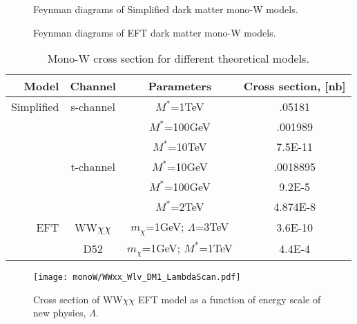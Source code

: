 \begin{figure}[hb]
  \quad
  \caption{Feynman diagrams of Simplified dark matter mono-W models.}
  \label{fig:feynMonoWSimple}
\end{figure}

\begin{figure}[hb]
  \quad
  \caption{Feynman diagrams of EFT dark matter mono-W models.}
  \label{fig:feynMonoWEFT}
\end{figure}


\begin{table}[tp]
  \begin{tabular}{r|c|c|c}
    Model 	& Channel 	  & Parameters	    & Cross section, [nb] \\
    \midrule
    Simplified  & s-channel	  & $M^{*}$=1TeV    & .05181 \\
		&		  & $M^{*}$=100GeV  & .001989 \\
		&		  & $M^{*}$=10TeV   & 7.5E-11 \\
		& t-channel	  & $M^{*}$=10GeV   & .0018895 \\
		&		  & $M^{*}$=100GeV  & 9.2E-5 \\
		&		  & $M^{*}$=2TeV    & 4.874E-8 \\
    \midrule
    EFT 	& WW$\chi\chi$	  & $m_{\chi}$=1GeV; $\Lambda$=3TeV    & 3.6E-10 \\
		& D52		  & $m_{\chi}$=1GeV; $M^{*}$=1TeV	& 4.4E-4 \\
  \end{tabular}
  \caption{Mono-W cross section for different theoretical models.}
  \label{tab:TriggerDetails}
\end{table}



\begin{figure}[hb]
 \texttt{[image: monoW/WWxx\_Wlv\_DM1\_LambdaScan.pdf]}
  \caption{Cross section of WW$\chi\chi$ EFT model as a function of energy scale of new physics, $\Lambda$.}
  \label{fig:lambdaScan}
\end{figure}